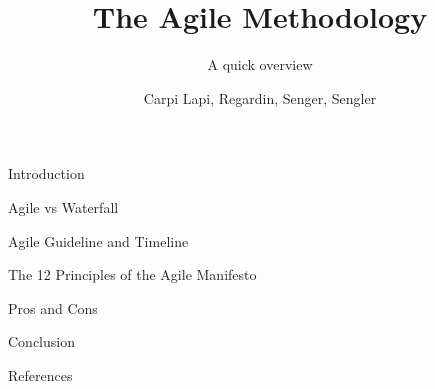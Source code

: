 \documentclass[10pt]{beamer}
\title{The Agile Methodology}
\subtitle{A quick overview}
\author{Carpi Lapi, Regardin, Senger, Sengler}
\institute{University of Strasbourg, M1 CSMI}
\begin{document}
\begin{frame}
  \titlepage
\end{frame}

\begin{frame}{Introduction}
\end{frame}

\begin{frame}{Agile vs Waterfall}
\end{frame}

\begin{frame}{Agile Guideline and Timeline}
\end{frame}

\begin{frame}{The 12 Principles of the Agile Manifesto}
\end{frame}

\begin{frame}{Pros and Cons}
\end{frame}

\begin{frame}{Conclusion}
\end{frame}

\begin{frame}{References}
\end{frame}
\end{document}
